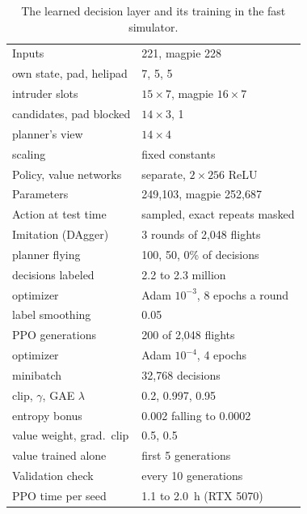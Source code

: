 \begin{table}[t]
\centering\footnotesize
\setlength{\tabcolsep}{4pt}
\caption{The learned decision layer and its training in the fast simulator.}
\label{tab:learner}
\begin{tabular}{@{}ll@{}}
\toprule
Inputs & 221, magpie 228 \\
\quad own state, pad, helipad & 7, 5, 5 \\
\quad intruder slots & $15 \times 7$, magpie $16 \times 7$ \\
\quad candidates, pad blocked & $14 \times 3$, 1 \\
\quad planner's view & $14 \times 4$ \\
\quad scaling & fixed constants \\
Policy, value networks & separate, $2 \times 256$ ReLU \\
Parameters & 249,103, magpie 252,687 \\
Action at test time & sampled, exact repeats masked \\
\midrule
Imitation (DAgger) & 3 rounds of 2,048 flights \\
\quad planner flying & 100, 50, 0\% of decisions \\
\quad decisions labeled & 2.2 to 2.3 million \\
\quad optimizer & Adam $10^{-3}$, 8 epochs a round \\
\quad label smoothing & 0.05 \\
PPO generations & 200 of 2,048 flights \\
\quad optimizer & Adam $10^{-4}$, 4 epochs \\
\quad minibatch & 32,768 decisions \\
\quad clip, $\gamma$, GAE $\lambda$ & 0.2, 0.997, 0.95 \\
\quad entropy bonus & 0.002 falling to 0.0002 \\
\quad value weight, grad.\ clip & 0.5, 0.5 \\
\quad value trained alone & first 5 generations \\
Validation check & every 10 generations \\
PPO time per seed & 1.1 to 2.0~h (RTX 5070) \\
\bottomrule
\end{tabular}
\end{table}
